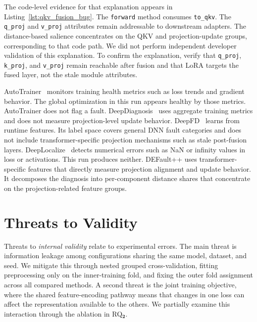 The code-level evidence for that explanation appears in Listing~\ref{lst:qkv_fusion_bug}. The \texttt{forward} method consumes \texttt{to\_qkv}. The \texttt{q\_proj} and \texttt{v\_proj} attributes remain addressable to downstream adapters. The distance-based salience concentrates on the QKV and projection-update groups, corresponding to that code path. We did not perform independent developer validation of this explanation. To confirm the explanation, verify that \texttt{q\_proj}, \texttt{k\_proj}, and \texttt{v\_proj} remain reachable after fusion and that LoRA targets the fused layer, not the stale module attributes.

AutoTrainer~\cite{autotrainer} monitors training health metrics such as loss trends and gradient behavior. The global optimization in this run appears healthy by those metrics. AutoTrainer does not flag a fault. DeepDiagnosis~\cite{deepdiagnosis} uses aggregate training metrics and does not measure projection-level update behavior. DeepFD~\cite{deepfd} learns from runtime features. Its label space covers general DNN fault categories and does not include transformer-specific projection mechanisms such as stale post-fusion layers. DeepLocalize~\cite{deeplocalize} detects numerical errors such as NaN or infinity values in loss or activations. This run produces neither. DEFault++ uses transformer-specific features that directly measure projection alignment and update behavior. It decomposes the diagnosis into per-component distance shares that concentrate on the projection-related feature groups.


\section{Threats to Validity}
\label{sec:defaultpp_threats}

Threats to \emph{internal validity} relate to experimental errors. The main threat is information leakage among configurations sharing the same model, dataset, and seed. We mitigate this through nested grouped cross-validation, fitting preprocessing only on the inner-training fold, and fixing the outer fold assignment across all compared methods. A second threat is the joint training objective, where the shared feature-encoding pathway means that changes in one loss can affect the representation available to the others. We partially examine this interaction through the ablation in RQ$\mathbf{_2}$.

